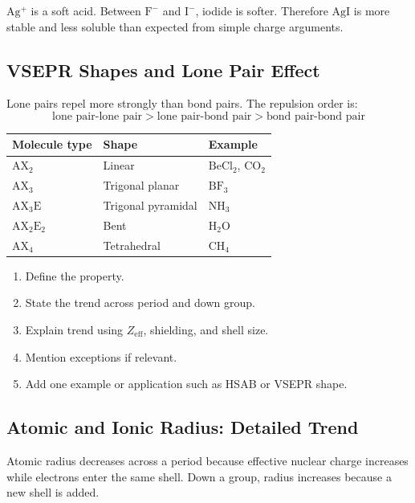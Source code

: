 \documentclass[12pt,a4paper]{article}
\begin{document}
\begin{tcolorbox}[examplebox, title={Solved Example: HSAB Prediction}]
$\mathrm{Ag^+}$ is a soft acid. Between $\mathrm{F^-}$ and $\mathrm{I^-}$, iodide is softer. Therefore $\mathrm{AgI}$ is more stable and less soluble than expected from simple charge arguments.
\end{tcolorbox}

\subsection{VSEPR Shapes and Lone Pair Effect}
Lone pairs repel more strongly than bond pairs. The repulsion order is:
\[
\text{lone pair-lone pair}>\text{lone pair-bond pair}>\text{bond pair-bond pair}
\]

\begin{tabularx}{\linewidth}{|B{2.8cm}|Y|Y|}
\hline
\textbf{Molecule type} & \textbf{Shape} & \textbf{Example} \\
\hline
$\mathrm{AX_2}$ & Linear & $\mathrm{BeCl_2}$, $\mathrm{CO_2}$ \\
\hline
$\mathrm{AX_3}$ & Trigonal planar & $\mathrm{BF_3}$ \\
\hline
$\mathrm{AX_3E}$ & Trigonal pyramidal & $\mathrm{NH_3}$ \\
\hline
$\mathrm{AX_2E_2}$ & Bent & $\mathrm{H_2O}$ \\
\hline
$\mathrm{AX_4}$ & Tetrahedral & $\mathrm{CH_4}$ \\
\hline
\end{tabularx}

\begin{tcolorbox}[masonbox, title={Periodic Properties: 10-Mark Answer Framework}]
\begin{enumerate}[leftmargin=*, itemsep=3pt, topsep=2pt]
  \item Define the property.
  \item State the trend across period and down group.
  \item Explain trend using $Z_{\mathrm{eff}}$, shielding, and shell size.
  \item Mention exceptions if relevant.
  \item Add one example or application such as HSAB or VSEPR shape.
\end{enumerate}
\end{tcolorbox}

\subsection{Atomic and Ionic Radius: Detailed Trend}
Atomic radius decreases across a period because effective nuclear charge increases while electrons enter the same shell. Down a group, radius increases because a new shell is added.
\end{document}
